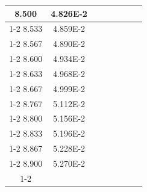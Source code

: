 \documentclass[article,12pt]{elsarticle}
\begin{document}
\begin{longtable}[c]{|c|c|cccccc}
8.500    & 4.826E-2  &                       &                              &                            &                       &                              &                               \\ \cline{1-2}
8.533    & 4.859E-2  &                       &                              &                            &                       &                              &                               \\ \cline{1-2}
8.567    & 4.890E-2  &                       &                              &                            &                       &                              &                               \\ \cline{1-2}
8.600    & 4.934E-2  &                       &                              &                            &                       &                              &                               \\ \cline{1-2}
8.633    & 4.968E-2  &                       &                              &                            &                       &                              &                               \\ \cline{1-2}
8.667    & 4.999E-2  &                       &                              &                            &                       &                              &                               \\ \cline{1-2}
8.767    & 5.112E-2  &                       &                              &                            &                       &                              &                               \\ \cline{1-2}
8.800    & 5.156E-2  &                       &                              &                            &                       &                              &                               \\ \cline{1-2}
8.833    & 5.196E-2  &                       &                              &                            &                       &                              &                               \\ \cline{1-2}
8.867    & 5.228E-2  &                       &                              &                            &                       &                              &                               \\ \cline{1-2}
8.900    & 5.270E-2  &                       &                              &                            &                       &                              &                               \\ \cline{1-2}

\end{longtable}
\end{document}
